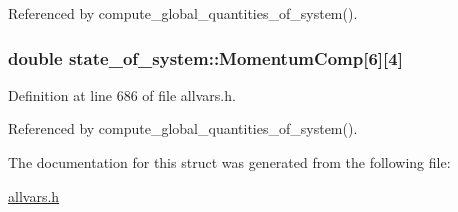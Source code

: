 Referenced by compute\_\-global\_\-quantities\_\-of\_\-system().

\hypertarget{structstate__of__system_a795ecb5f9b1749847bdb2d8d275323c1}{
\subsubsection[{MomentumComp}]{\setlength{\rightskip}{0pt plus 5cm}double {\bf state\_\-of\_\-system::MomentumComp}\mbox{[}6\mbox{]}\mbox{[}4\mbox{]}}}
\label{structstate__of__system_a795ecb5f9b1749847bdb2d8d275323c1}


Definition at line 686 of file allvars.h.



Referenced by compute\_\-global\_\-quantities\_\-of\_\-system().



The documentation for this struct was generated from the following file:\begin{DoxyCompactItemize}
\item 
\hyperlink{allvars_8h}{allvars.h}\end{DoxyCompactItemize}
